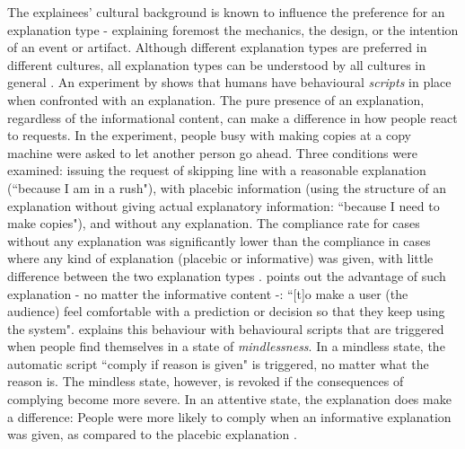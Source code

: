 The explainees' cultural background is known to influence the preference for an explanation type - explaining foremost the mechanics, the design, or the intention of an event or artifact. Although different explanation types are preferred in different cultures, all explanation types can be understood by all cultures in general \cite{keil2006explanation}.\newline
An experiment by \cite{langer1978mindlessness} shows that humans have behavioural \textit{scripts} in place when confronted with an explanation. The pure presence of an explanation, regardless of the informational content, can make a difference in how people react to requests. In the experiment, people busy with making copies at a copy machine were asked to let another person go ahead. Three conditions were examined: issuing the request of skipping line with a reasonable explanation (``because I am in a rush"), with placebic information (using the structure of an explanation without giving actual explanatory information: ``because I need to make copies"), and without any explanation. The compliance rate for cases without any explanation was significantly lower than the compliance in cases where any kind of explanation (placebic or informative) was given, with little difference between the two explanation types \cite{langer1978mindlessness}. \cite{weller2017challenges} points out the advantage of such explanation - no matter the informative content -: ``[t]o make a user (the audience) feel comfortable with a prediction or decision so that they keep using the system". \cite{langer1978mindlessness} explains this behaviour with behavioural scripts that are triggered when people find themselves in a state of \textit{mindlessness}. In a mindless state, the automatic script ``comply if reason is given" is triggered, no matter what the reason is. The mindless state, however, is revoked if the consequences of complying become more severe. In an attentive state, the explanation does make a difference: People were more likely to comply when an informative explanation was given, as compared to the placebic explanation \cite{langer1978mindlessness}. 



